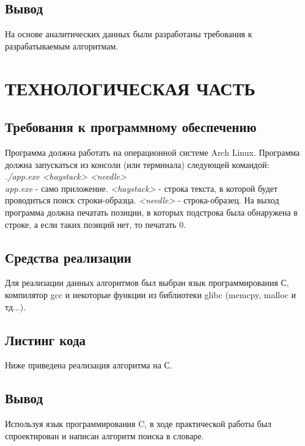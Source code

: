 \documentclass[a4paper,12pt]{article}
\begin{document}
\newpage
\subsection{Вывод}
На основе аналитических данных были разработаны требования к разрабатываемым алгоритмам.


\newpage
\section{ТЕХНОЛОГИЧЕСКАЯ ЧАСТЬ}
\subsection{Требования к программному обеспечению}
Программа должна работать на операционной системе Arch Linux. 
Программа должна запускаться из консоли (или терминала) следующей командой:\\
\textit{./app.exe <haystack> <needle>} \\
\textit{app.exe} - само приложение. \textit{<haystack>} - строка текста, в которой будет проводиться поиск строки-образца. \textit{<needle>} - строка-образец.
На выход программа должна печатать позиции, в которых подстрока была обнаружена в строке, а если таких позиций нет, то печатать 0.

\newpage
\subsection{Средства реализации}
Для реализации данных алгоритмов был выбран язык программирования С, компилятор gcc и некоторые функции из библиотеки glibc (memcpy, malloc и тд...). \\

\newpage
\subsection{Листинг кода}
Ниже приведена реализация алгоритма на С.\\


\newpage
\subsection{Вывод}
Используя язык программирования C, в ходе практической работы был спроектирован и написан алгоритм поиска в словаре.
\end{document}
